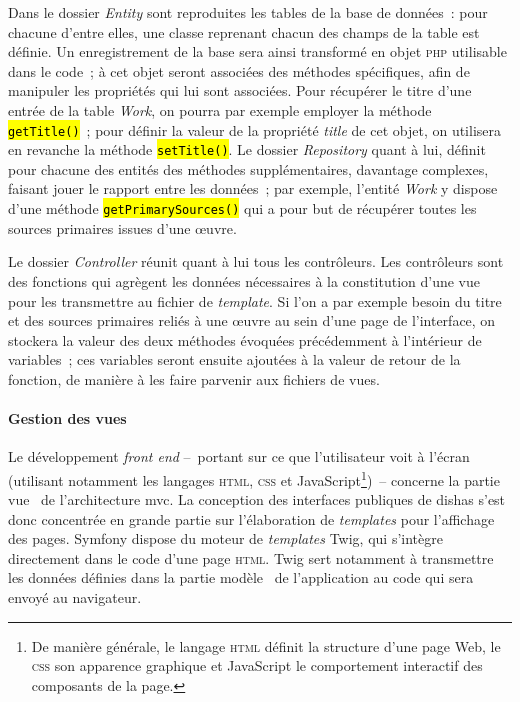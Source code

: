\documentclass[a4paper,12pt,twoside]{book}
\let\OldTexttt\texttt
\renewcommand{\texttt}[1]{\OldTexttt{\hl{#1}}}
\newcommand{\eng}{\emph}
\newcommand{\bdd}{base de données\xspace}
\newcommand{\html}{\textsc{html}\xspace}
\newcommand{\php}{\textsc{php}\xspace}
\newcommand{\css}{\textsc{css}\xspace}
\newcommand{\g}[1]{\og#1~\fg}
\newcommand{\dishas}{\gls{dishas}\xspace}
\newcommand{\mvc}{\gls{mvc}\xspace}
\begin{document}
Dans le dossier \eng{Entity} sont reproduites les tables de la \bdd~: pour chacune d'entre elles, une classe reprenant chacun des champs de la table est définie. Un enregistrement de la base sera ainsi transformé en objet \php utilisable dans le code~; à cet objet seront associées des méthodes spécifiques, afin de manipuler les propriétés qui lui sont associées. Pour récupérer le titre d'une entrée de la table \eng{Work}, on pourra par exemple employer la méthode \texttt{getTitle()}~; pour définir la valeur de la propriété \eng{title} de cet objet, on utilisera en revanche la méthode \texttt{setTitle()}. Le dossier \eng{Repository} quant à lui, définit pour chacune des entités des méthodes supplémentaires, davantage complexes, faisant jouer le rapport entre les données~; par exemple, l'entité \eng{Work} y dispose d'une méthode \texttt{getPrimarySources()} qui a pour but de récupérer toutes les sources primaires issues d'une œuvre.

Le dossier \eng{Controller} réunit quant à lui tous les contrôleurs. Les contrôleurs sont des fonctions qui agrègent les données nécessaires à la constitution d'une vue pour les transmettre au fichier de \eng{template}. Si l'on a par exemple besoin du titre et des sources primaires reliés à une œuvre au sein d'une page de l'interface, on stockera la valeur des deux méthodes évoquées précédemment à l'intérieur de variables~; ces variables seront ensuite ajoutées à la valeur de retour de la fonction, de manière à les faire parvenir aux fichiers de vues.

				\paragraph{Gestion des vues}
Le développement \eng{front end} –~portant sur ce que l'utilisateur voit à l'écran (utilisant notamment les langages \html, \css et JavaScript\footnote{De manière générale, le langage \html définit la structure d'une page Web, le \css son apparence graphique et JavaScript le comportement interactif des composants de la page.})~– concerne la partie \g{vue} de l'architecture \mvc. La conception des interfaces publiques de \dishas s'est donc concentrée en grande partie sur l'élaboration de \eng{templates} pour l'affichage des pages. Symfony dispose du moteur de \eng{templates} Twig, qui s'intègre directement dans le code d'une page \html. Twig sert notamment à transmettre les données définies dans la partie \g{modèle} de l'application au code qui sera envoyé au navigateur.
\end{document}
